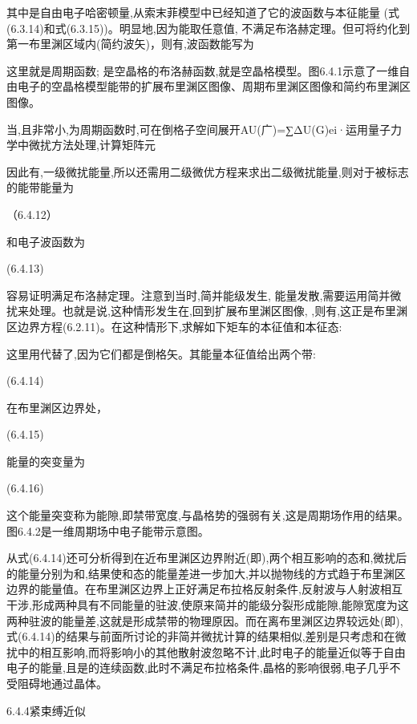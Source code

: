 	其中是自由电子哈密顿量,从索末菲模型中已经知道了它的波函数与本征能量 (式(6.3.14)和式(6.3.15))。明显地,因为能取任意值, 不满足布洛赫定理。但可将约化到第一布里渊区域内(简约波矢)，则有,波函数能写为



这里就是周期函数; 是空晶格的布洛赫函数,就是空晶格模型。图6.4.1示意了一维自由电子的空晶格模型能带的扩展布里渊区图像、周期布里渊区图像和简约布里渊区图像。





当,且非常小,为周期函数时,可在倒格子空间展开AU(广)=∑ΔU(G)ei·运用量子力学中微扰方法处理,计算矩阵元



因此有,一级微扰能量,所以还需用二级微优方程来求出二级微扰能量,则对于被标志的能带能量为

	（6.4.12）

和电子波函数为

 	(6.4.13)

容易证明满足布洛赫定理。注意到当时,简并能级发生, 能量发散,需要运用简并微扰来处理。也就是说,这种情形发生在,回到扩展布里渊区图像, ,则有,这正是布里渊区边界方程(6.2.11)。在这种情形下,求解如下矩车的本征值和本征态:



这里用代替了,因为它们都是倒格矢。其能量本征值给出两个带: 

 (6.4.14)

在布里渊区边界处，

 	(6.4.15)

能量的突变量为

 (6.4.16)

这个能量突变称为能隙,即禁带宽度,与晶格势的强弱有关,这是周期场作用的结果。图6.4.2是一维周期场中电子能带示意图。



从式(6.4.14)还可分析得到在近布里渊区边界附近(即),两个相互影响的态和,微扰后的能量分别为和,结果使和态的能量差进一步加大,并以抛物线的方式趋于布里渊区边界的能量值。在布里渊区边界上正好满足布拉格反射条件,反射波与人射波相互干涉,形成两种具有不同能量的驻波,使原来简并的能级分裂形成能隙,能隙宽度为这两种驻波的能量差,这就是形成禁带的物理原因。而在离布里渊区边界较远处(即),式(6.4.14)的结果与前面所讨论的非简并微扰计算的结果相似,差别是只考虑和在微扰中的相互影响,而将影响小的其他散射波忽略不计,此时电子的能量近似等于自由电子的能量,且是的连续函数,此时不满足布拉格条件,晶格的影响很弱,电子几乎不受阻碍地通过晶体。



6.4.4紧束缚近似

